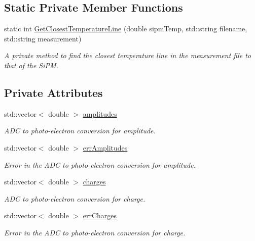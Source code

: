 \subsection*{Static Private Member Functions}
\begin{DoxyCompactItemize}
\item 
static int \hyperlink{classICalibration_a754365b6cc94bbec25a5cede2d245e9e}{Get\+Closest\+Temperature\+Line} (double sipm\+Temp, std\+::string filename, std\+::string measurement)
\begin{DoxyCompactList}\small\item\em A private method to find the closest temperature line in the measurement file to that of the Si\+PM. \end{DoxyCompactList}\end{DoxyCompactItemize}
\subsection*{Private Attributes}
\begin{DoxyCompactItemize}
\item 
\mbox{\label{classICalibration_a953bf9ab7ba0ac7f7ba26d2af0c5f592}} 
std\+::vector$<$ double $>$ \hyperlink{classICalibration_a953bf9ab7ba0ac7f7ba26d2af0c5f592}{amplitudes}
\begin{DoxyCompactList}\small\item\em A\+DC to photo-\/electron conversion for amplitude. \end{DoxyCompactList}\item 
\mbox{\label{classICalibration_a6f2a51226f49e4fbb10f19f38db05ff0}} 
std\+::vector$<$ double $>$ \hyperlink{classICalibration_a6f2a51226f49e4fbb10f19f38db05ff0}{err\+Amplitudes}
\begin{DoxyCompactList}\small\item\em Error in the A\+DC to photo-\/electron conversion for amplitude. \end{DoxyCompactList}\item 
\mbox{\label{classICalibration_a59181afe6c712d28ccdb0d1b1901737e}} 
std\+::vector$<$ double $>$ \hyperlink{classICalibration_a59181afe6c712d28ccdb0d1b1901737e}{charges}
\begin{DoxyCompactList}\small\item\em A\+DC to photo-\/electron conversion for charge. \end{DoxyCompactList}\item 
\mbox{\label{classICalibration_a8aa9bc9b799683b8022afd572005419c}} 
std\+::vector$<$ double $>$ \hyperlink{classICalibration_a8aa9bc9b799683b8022afd572005419c}{err\+Charges}
\begin{DoxyCompactList}\small\item\em Error in the A\+DC to photo-\/electron conversion for charge. \end{DoxyCompactList}\end{DoxyCompactItemize}


